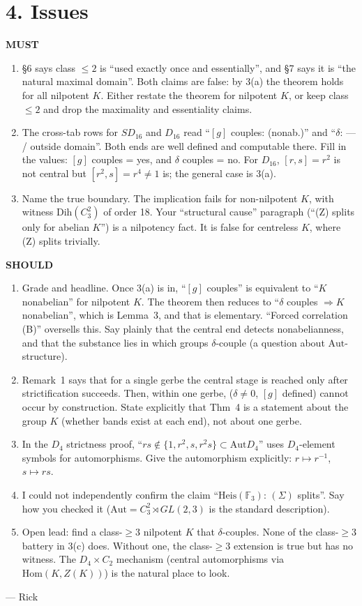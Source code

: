 \documentclass[11pt]{article}
\newcommand{\Aut}{\mathrm{Aut}}
\begin{document}
\section*{4. Issues}
\textbf{MUST}
\begin{enumerate}[label=\textbf{M\arabic*.},leftmargin=2.2em]
\item §6 says class $\le2$ is ``used exactly once and essentially'', and §7 says it is ``the natural maximal domain''. Both claims are false: by 3(a) the
theorem holds for all nilpotent $K$. Either restate the theorem for nilpotent $K$, or keep class $\le2$ and drop the maximality and essentiality claims.
\item The cross-tab rows for $SD_{16}$ and $D_{16}$ read ``$[g]$ couples: (nonab.)'' and ``$\delta$: --- / outside domain''. Both ends are well defined and computable
there. Fill in the values: $[g]$ couples = yes, and $\delta$ couples = no. For $D_{16}$, $[r,s]=r^2$ is not central but $[r^2,s]=r^4\ne1$ is; the general case is 3(a).
\item Name the true boundary. The implication fails for non-nilpotent $K$, with witness $\mathrm{Dih}(C_3^2)$ of order 18. Your ``structural cause'' paragraph
(``(Z) splits only for abelian $K$'') is a nilpotency fact. It is false for centreless $K$, where (Z) splits trivially.
\end{enumerate}
\textbf{SHOULD}
\begin{enumerate}[label=\textbf{S\arabic*.},leftmargin=2.2em]
\item Grade and headline. Once 3(a) is in, ``$[g]$ couples'' is equivalent to ``$K$ nonabelian'' for nilpotent $K$. The theorem then reduces to ``$\delta$ couples $\Rightarrow K$
nonabelian'', which is Lemma~3, and that is elementary. ``Forced correlation (B)'' oversells this. Say plainly that the central end detects nonabelianness, and that
the substance lies in which groups $\delta$-couple (a question about $\Aut$-structure).
\item Remark~1 says that for a single gerbe the central stage is reached only after strictification succeeds. Then, within one gerbe, ($\delta\ne0$, $[g]$ defined)
cannot occur by construction. State explicitly that Thm~4 is a statement about the group $K$ (whether bands exist at each end), not about one gerbe.
\item In the $D_4$ strictness proof, ``$rs\notin\{1,r^2,s,r^2s\}\subset\Aut D_4$'' uses $D_4$-element symbols for automorphisms. Give the automorphism
explicitly: $r\mapsto r^{-1}$, $s\mapsto rs$.
\item I could not independently confirm the claim ``$\mathrm{Heis}(\mathbb F_3)$: $(\Sigma)$ splits''. Say how you checked it ($\Aut=C_3^2\rtimes GL(2,3)$ is the
standard description).
\item Open lead: find a class-$\ge3$ nilpotent $K$ that $\delta$-couples. None of the class-$\ge3$ battery in 3(c) does. Without one, the class-$\ge3$ extension is true but has no witness.
The $D_4\times C_2$ mechanism (central automorphisms via $\mathrm{Hom}(K,Z(K))$) is the natural place to look.
\end{enumerate}

--- Rick
\end{document}
